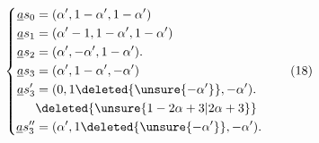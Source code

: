 \[
\left\{\begin{aligned}
\underline a s_0&=(\alpha',1-\alpha',1-\alpha')\\
\underline a s_1&=(\alpha'-1,1-\alpha',1-\alpha')\\
\underline a s_2&=(\alpha',-\alpha',1-\alpha').\\
\underline a s_3&=(\alpha',1-\alpha',-\alpha')\\
\underline a s_3'&=(0,1\deleted{\unsure{-\alpha'}},-\alpha').\\
&\deleted{\unsure{1-2\alpha+3|2\alpha+3}}\\
\underline a s_3''&=(\alpha',1\deleted{\unsure{-\alpha'}},-\alpha').
\end{aligned}\right.
\tag*{(18)}
\]
